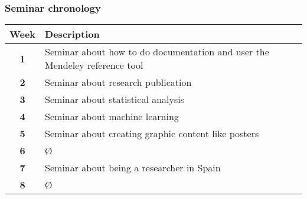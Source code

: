 \documentclass{article}
\begin{document}
\subsubsection{Seminar chronology} \hypertarget{sem_chron}{}

\begin{center}

\begin{tabular}{ |c|l| } 
    \hline
    \textbf{Week} & \textbf{Description}\\
    \hline\hline
    \textbf{1} & Seminar about how to do documentation and user the Mendeley reference tool \\
    \hline
    \textbf{2} & Seminar about research publication \\
    \hline
    \textbf{3} & Seminar about statistical analysis \\
    \hline
    \textbf{4} & Seminar about machine learning \\
    \hline
    \textbf{5} & Seminar about creating graphic content like posters \\
    \hline
    \textbf{6} & \O \\
    \hline
    \textbf{7} & Seminar about being a researcher in Spain \\
    \hline
    \textbf{8} & \O \\
    \hline
\end{tabular}
\end{center}

\newpage
\end{document}
